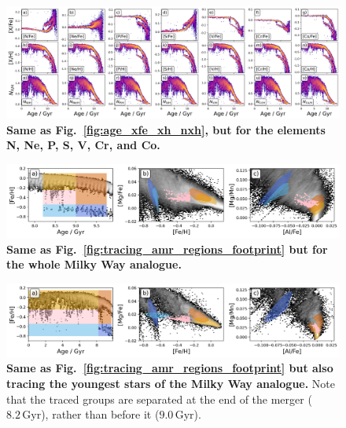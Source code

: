 \documentclass[fleqn,usenatbib]{mnras}
\begin{document}
\begin{figure}
	\includegraphics[width=\textwidth]{figures/age_xfe_xh_nxh_others.png}
    \caption{
    \textbf{Same as Fig.~\ref{fig:age_xfe_xh_nxh}, but for the elements N, Ne, P, S, V, Cr, and Co.}
    }
    \label{fig:appendix_xfe_xh_nx}
\end{figure}

\begin{figure}
	\includegraphics[width=\textwidth]{figures/tracing_amr_regions_whole.png}
    \caption{
    \textbf{Same as Fig.~\ref{fig:tracing_amr_regions_footprint} but for the whole Milky Way analogue.}
    }
    \label{fig:tracing_amr_regions_whole}
\end{figure}

\begin{figure}
	\includegraphics[width=\textwidth]{figures/tracing_amr_regions_disk.png}
    \caption{
    \textbf{Same as Fig.~\ref{fig:tracing_amr_regions_footprint} but also tracing the youngest stars of the Milky Way analogue.} Note that the traced groups are separated at the end of the merger ($8.2\,\mathrm{Gyr}$), rather than before it ($9.0\,\mathrm{Gyr}$).
    }
    \label{fig:tracing_amr_regions_disk}
\end{figure}


\bsp	%
\label{lastpage}
\end{document}
